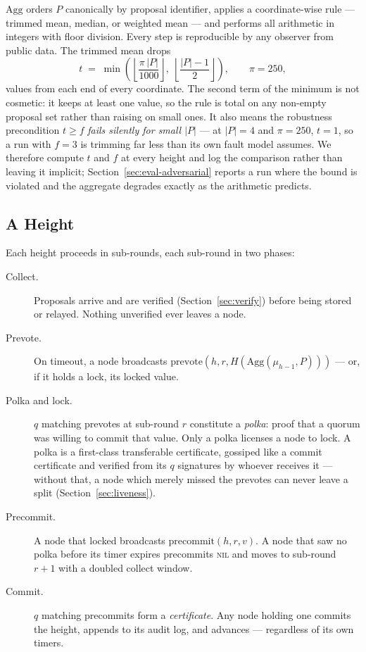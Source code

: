 \documentclass{llncs}
\begin{document}
$\mathrm{Agg}$ orders $P$ canonically by proposal identifier, applies a
coordinate-wise rule --- trimmed mean, median, or weighted mean --- and performs
all arithmetic in integers with floor division. Every step is reproducible by
any observer from public data. The trimmed mean drops
\begin{equation}
  t \;=\; \min\!\left(\left\lfloor \frac{\pi\,|P|}{1000} \right\rfloor,\;
                      \left\lfloor \frac{|P|-1}{2} \right\rfloor \right),
  \qquad \pi = 250,
  \label{eq:trim}
\end{equation}
values from each end of every coordinate. The second term of the minimum is not
cosmetic: it keeps at least one value, so the rule is total on any non-empty
proposal set rather than raising on small ones. It also means the robustness
precondition $t \geq f$ \emph{fails silently for small $|P|$} --- at $|P|=4$ and
$\pi=250$, $t=1$, so a run with $f=3$ is trimming far less than its own fault
model assumes. We therefore compute $t$ and $f$ at every height and log the
comparison rather than leaving it implicit; Section~\ref{sec:eval-adversarial}
reports a run where the bound is violated and the aggregate degrades exactly as
the arithmetic predicts.

\subsection{A Height}

Each height proceeds in sub-rounds, each sub-round in two phases:

\begin{description}
  \item[Collect.] Proposals arrive and are verified (Section~\ref{sec:verify})
    before being stored or relayed. Nothing unverified ever leaves a node.
  \item[Prevote.] On timeout, a node broadcasts $\mathrm{prevote}(h, r,
    H(\mathrm{Agg}(\mu_{h-1}, P)))$ --- or, if it holds a lock, its locked value.
  \item[Polka and lock.] $q$ matching prevotes at sub-round $r$ constitute a
    \emph{polka}: proof that a quorum was willing to commit that value. Only a
    polka licenses a node to lock. A polka is a first-class transferable
    certificate, gossiped like a commit certificate and verified from its $q$
    signatures by whoever receives it --- without that, a node which merely
    missed the prevotes can never leave a split (Section~\ref{sec:liveness}).
  \item[Precommit.] A node that locked broadcasts $\mathrm{precommit}(h, r, v)$.
    A node that saw no polka before its timer expires precommits \textsc{nil}
    and moves to sub-round $r+1$ with a doubled collect window.
  \item[Commit.] $q$ matching precommits form a \emph{certificate}. Any node
    holding one commits the height, appends to its audit log, and advances ---
    regardless of its own timers.
\end{description}
\end{document}
